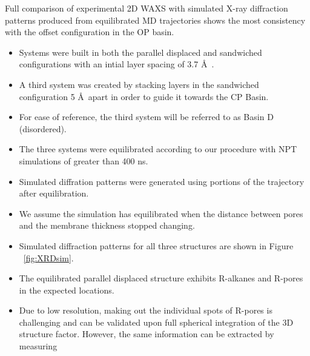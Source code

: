 \documentclass{article}
\newcommand{\angstrom}{\textup{\AA}}
\begin{document}
  Full comparison of experimental 2D WAXS with simulated X-ray diffraction
  patterns produced from equilibrated MD trajectories shows the most consistency
  with the offset configuration in the OP basin.
  \begin{itemize}
  	\item Systems were built in both the parallel displaced and sandwiched 
	configurations with an intial layer spacing of 3.7 \angstrom~.
	\item A third system was created by stacking layers in the sandwiched 
	configuration 5 \angstrom~apart in order to guide it towards the CP Basin.
	\item For ease of reference, the third system will be referred to as Basin D (disordered). 
	\item The three systems were equilibrated according to our procedure with
	NPT simulations of greater than 400 ns.
	\item Simulated diffration patterns were generated using portions of the
	trajectory after equilibration.  
	\item We assume the simulation has equilibrated when the distance between 
	pores and the membrane thickness stopped changing.
	\item Simulated diffraction patterns for all three structures are shown in 
	Figure ~\ref{fig:XRDsim}. 
	\item The equilibrated parallel displaced structure exhibits R-alkanes and
	R-pores in the expected locations. 
	\item Due to low resolution, making out the individual spots of R-pores is
	challenging and can be validated upon full spherical integration of the 3D 
	structure factor. However, the same information can be extracted by measuring 

\end{itemize}
\end{document}
